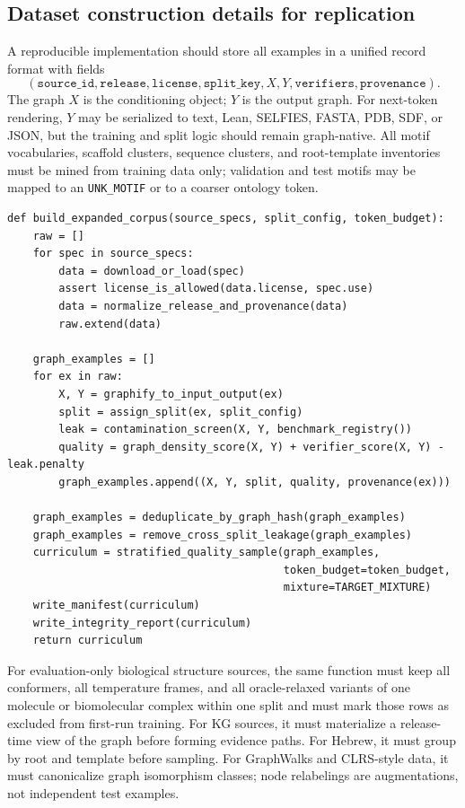 \documentclass[11pt]{article}
\newcommand{\1}{\mathbf{1}}
\begin{document}
\subsection{Dataset construction details for replication}
\label{sec:dataset-replication-details}

A reproducible implementation should store all examples in a unified record format with fields
\[
(\texttt{source\_id},\texttt{release},\texttt{license},\texttt{split\_key},X,Y,\texttt{verifiers},\texttt{provenance}).
\]
The graph $X$ is the conditioning object; $Y$ is the output graph. For next-token rendering, $Y$ may be serialized to text, Lean, SELFIES, FASTA, PDB, SDF, or JSON, but the training and split logic should remain graph-native. All motif vocabularies, scaffold clusters, sequence clusters, and root-template inventories must be mined from training data only; validation and test motifs may be mapped to an \texttt{UNK\_MOTIF} or to a coarser ontology token.

\begin{lstlisting}[caption={End-to-end source expansion and graphification pipeline.}]
def build_expanded_corpus(source_specs, split_config, token_budget):
    raw = []
    for spec in source_specs:
        data = download_or_load(spec)
        assert license_is_allowed(data.license, spec.use)
        data = normalize_release_and_provenance(data)
        raw.extend(data)

    graph_examples = []
    for ex in raw:
        X, Y = graphify_to_input_output(ex)
        split = assign_split(ex, split_config)
        leak = contamination_screen(X, Y, benchmark_registry())
        quality = graph_density_score(X, Y) + verifier_score(X, Y) - leak.penalty
        graph_examples.append((X, Y, split, quality, provenance(ex)))

    graph_examples = deduplicate_by_graph_hash(graph_examples)
    graph_examples = remove_cross_split_leakage(graph_examples)
    curriculum = stratified_quality_sample(graph_examples,
                                           token_budget=token_budget,
                                           mixture=TARGET_MIXTURE)
    write_manifest(curriculum)
    write_integrity_report(curriculum)
    return curriculum
\end{lstlisting}

For evaluation-only biological structure sources, the same function must keep all conformers, all temperature frames, and all oracle-relaxed variants of one molecule or biomolecular complex within one split and must mark those rows as excluded from first-run training. For KG sources, it must materialize a release-time view of the graph before forming evidence paths. For Hebrew, it must group by root and template before sampling. For GraphWalks and CLRS-style data, it must canonicalize graph isomorphism classes; node relabelings are augmentations, not independent test examples.
\end{document}
